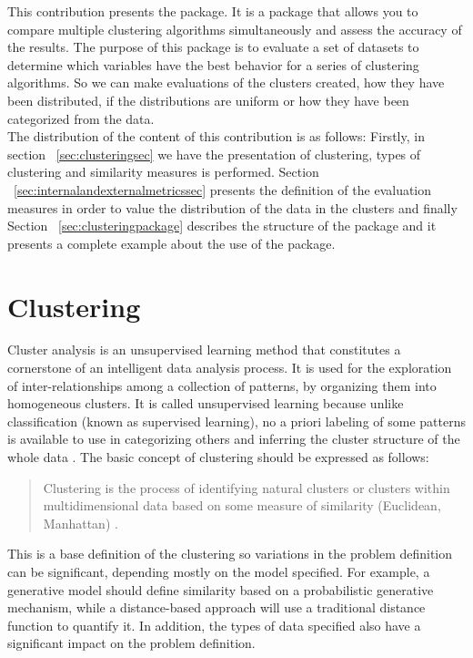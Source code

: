 This contribution presents the  package. It is a package that allows you to compare multiple clustering algorithms simultaneously and assess the accuracy of the results. The purpose of this package is to evaluate a set of datasets to determine which variables have the best behavior for a series of clustering algorithms. So we can make evaluations of the clusters created, how they have been distributed, if the distributions are uniform or how they have been categorized from the data.\\
The distribution of the content of this contribution is as follows: Firstly, in section ~\ref{sec:clusteringsec} we have the  presentation of clustering, types of clustering and similarity measures is performed. Section ~\ref{sec:internalandexternalmetricssec} presents the definition of the evaluation measures in order to value the distribution of the data in the clusters and finally Section ~\ref{sec:clusteringpackage} describes the structure of the package and it presents a complete example about the use of the package.

\section*{Clustering}\label{sec:clusteringsec}

Cluster analysis is an unsupervised learning method that constitutes a cornerstone of an intelligent data analysis process. It is used for the exploration of inter-relationships among a collection of patterns, by organizing them into homogeneous clusters. It is called unsupervised learning because unlike classification (known as supervised learning), no a priori labeling of some patterns is available to use in categorizing others and inferring the cluster structure of the whole data \citep{b17}. The basic concept of clustering should be expressed as follows:
\\
\begin{quote}
Clustering is the process of identifying natural clusters or clusters within multidimensional data based on some measure of similarity (Euclidean, Manhattan) \citep{b18}.
\end{quote}


This is a base definition of the clustering so variations in the problem definition can be significant, depending mostly on the model specified. For example, a generative model should define similarity based on a probabilistic generative mechanism, while a distance-based approach will use a traditional distance function to quantify it. In addition, the types of data specified also have a significant impact on the problem definition.

